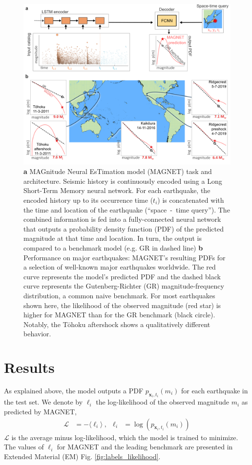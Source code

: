 \documentclass[pdflatex]{sn-jnl}
\begin{document}
\begin{figure}[h!]
	\centering
        \includegraphics[width=1\textwidth]{figures/intro_fig.png}
	\caption{\textbf{a} MAGnitude Neural EsTimation model (MAGNET) task and architecture. Seismic history is continuously encoded using a Long Short-Term Memory neural network. For each earthquake, the encoded history up to its occurrence time ($t_i$) is concatenated with the time and location of the earthquake (``space~-~time query''). The combined information is fed into a fully-connected neural network that outputs a probability density function (PDF) of the predicted magnitude at that time and location. In turn, the output is compared to a benchmark model (e.g. GR in dashed line) \textbf{b} Performance on major earthquakes: MAGNET's resulting PDFs for a selection of well-known major earthquakes worldwide. The red curve represents the model's predicted PDF and the dashed black curve represents the Gutenberg-Richter (GR) magnitude-frequency distribution, a common naive benchmark. For most earthquakes shown here, the likelihood of the observed magnitude (red star) is higher for MAGNET than for the GR benchmark (black circle). Notably, the Tōhoku aftershock shows a qualitatively different behavior.
    }
\label{fig:intro_fig}
\end{figure}

\section{Results} \label{sec:results}
As explained above, the model outputs a PDF $p_{\textbf{x}_i, t_i}(m_i)$ for each earthquake in the test set. We denote by $\ell_i$ the log-likelihood of the observed magnitude $m_i$ as predicted by MAGNET, 
\begin{align}
    \mathcal{L} &= -\langle \ell_i \rangle\ , 
    &
    \ell_i&=\log\left(p_{\textbf{x}_i, t_i}(m_i)\right)
    \label{eq:likelihood}
\end{align}
 $\mathcal{L}$ is the average minus log-likelihood, which the model is trained to minimize.  The values of $\ell_i$ for MAGNET and the leading benchmark are presented in Extended Material (EM) Fig. \ref{fig:labels_likelihood}.
 
\end{document}
